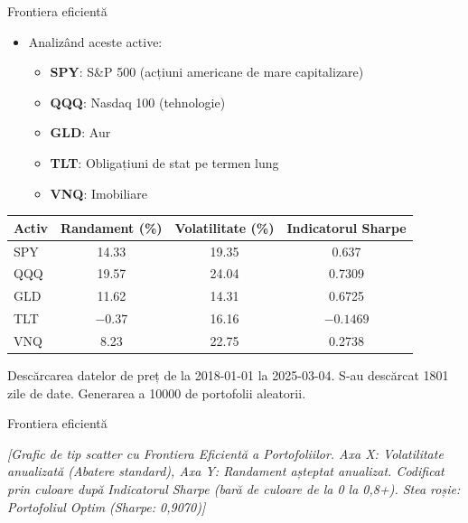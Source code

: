\documentclass[9pt, aspectratio=169, t]{beamer}
\theoremstyle{definition}
\begin{document}
\begin{frame}{Frontiera eficientă}
\begin{itemize}
    \item Analizând aceste active:
    \begin{itemize}
        \item \textbf{SPY}: S\&P 500 (acțiuni americane de mare capitalizare)
        \item \textbf{QQQ}: Nasdaq 100 (tehnologie)
        \item \textbf{GLD}: Aur
        \item \textbf{TLT}: Obligațiuni de stat pe termen lung
        \item \textbf{VNQ}: Imobiliare
    \end{itemize}
\end{itemize}

\vspace{0.2cm}

\begin{center}
{\small
\begin{tabular}{lccc}
\toprule
\textbf{Activ} & \textbf{Randament (\%)} & \textbf{Volatilitate (\%)} & \textbf{Indicatorul Sharpe} \\
\midrule
SPY & 14.33 & 19.35 & 0.637 \\
QQQ & 19.57 & 24.04 & 0.7309 \\
GLD & 11.62 & 14.31 & 0.6725 \\
TLT & $-0.37$ & 16.16 & $-0.1469$ \\
VNQ & 8.23 & 22.75 & 0.2738 \\
\bottomrule
\end{tabular}
}
\end{center}

\vspace{0.1cm}

{\small Descărcarea datelor de preț de la 2018-01-01 la 2025-03-04. S-au descărcat 1801 zile de date. Generarea a 10000 de portofolii aleatorii.}
\end{frame}

\begin{frame}{Frontiera eficientă}
\begin{center}
    {\small\textit{[Grafic de tip scatter cu Frontiera Eficientă a Portofoliilor. Axa X: Volatilitate anualizată (Abatere standard), Axa Y: Randament așteptat anualizat. Codificat prin culoare după Indicatorul Sharpe (bară de culoare de la 0 la 0,8+). Stea roșie: Portofoliul Optim (Sharpe: 0,9070)]}}
\end{center}
\end{frame}
\end{document}
